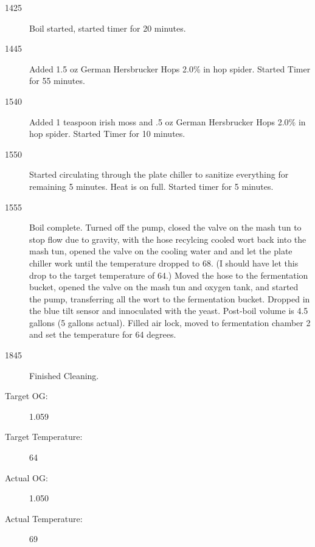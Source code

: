 \begin{description}
    \item[1425] Boil started, started timer for 20 minutes.
    \item[1445] Added 1.5 oz German Hersbrucker Hops 2.0\% in hop spider.  Started Timer for 55 minutes.
    \item[1540] Added 1 teaspoon irish moss and .5 oz  German Hersbrucker Hops 2.0\% in hop spider. Started Timer for 10 minutes.
    \item[1550] Started circulating through the plate chiller to sanitize everything for remaining 5 minutes.  Heat is on full. Started timer for 5 minutes.
    \item[1555] Boil complete.  Turned off the pump, closed the valve on the mash tun to stop flow due to gravity, with the hose recylcing cooled wort back into the mash tun, opened the valve on the cooling water and and let the plate chiller work until the temperature dropped to 68.  (I should have let this drop to the target temperature of 64.) Moved the hose to the fermentation bucket, opened the valve on the mash tun and oxygen tank, and started the pump, transferring all the wort to the fermentation bucket.  Dropped in the blue tilt sensor and innoculated with the yeast. Post-boil volume is 4.5 gallons (5 gallons actual).  Filled air lock, moved to fermentation chamber 2 and set the temperature for 64 degrees.
    \item[1845] Finished Cleaning.

    \item[Target OG:] 1.059
    \item[Target Temperature:] 64
    \item[Actual OG:] 1.050
    \item[Actual Temperature:] 69
\end{description}

